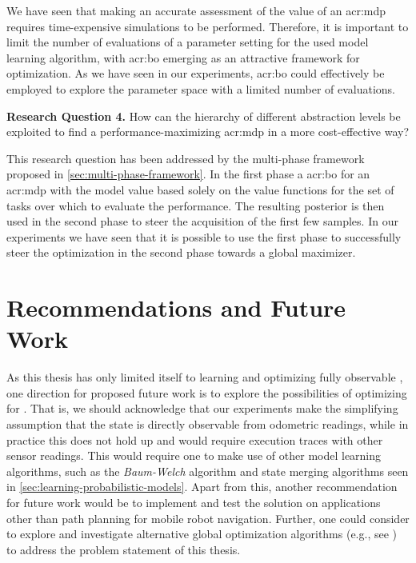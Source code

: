 We have seen that making an accurate assessment of the value of an \acrshort{acr:mdp} requires time-expensive simulations to be performed.
Therefore, it is important to limit the number of evaluations of a parameter setting for the used model learning algorithm, with \acrshort{acr:bo} emerging as an attractive framework for optimization.
As we have seen in our experiments, \acrshort{acr:bo} could effectively be employed to explore the parameter space with a limited number of evaluations.

\vspace{16pt}
\noindent%
\textbf{Research Question 4.} How can the hierarchy of different abstraction levels be exploited to find a performance-maximizing \acrshort{acr:mdp} in a more cost-effective way?
\vspace{12pt}

This research question has been addressed by the multi-phase framework proposed in \autoref{sec:multi-phase-framework}.
In the first phase a \acrshort{acr:bo} for an \acrshort{acr:mdp} with the model value based solely on the value functions for the set of tasks over which to evaluate the performance.
The resulting posterior is then used in the second phase to steer the acquisition of the first few samples.
In our experiments we have seen that it is possible to use the first phase to successfully steer the optimization in the second phase towards a global maximizer.


\section{Recommendations and Future Work}
\label{sec:recommendations-future-work}

As this thesis has only limited itself to learning and optimizing fully observable , one direction for proposed future work is to explore the possibilities of optimizing for .
That is, we should acknowledge that our experiments make the simplifying assumption that the state is directly observable from odometric readings, while in practice this does not hold up and would require execution traces with other sensor readings.
This would require one to make use of other model learning algorithms, such as the \textit{Baum-Welch} algorithm and state merging algorithms seen in \autoref{sec:learning-probabilistic-models}.
Apart from this, another recommendation for future work would be to implement and test the solution on applications other than path planning for mobile robot navigation.
Further, one could consider to explore and investigate alternative global optimization algorithms (e.g., see \cite{bergstra2011algorithms}) to address the problem statement of this thesis.

